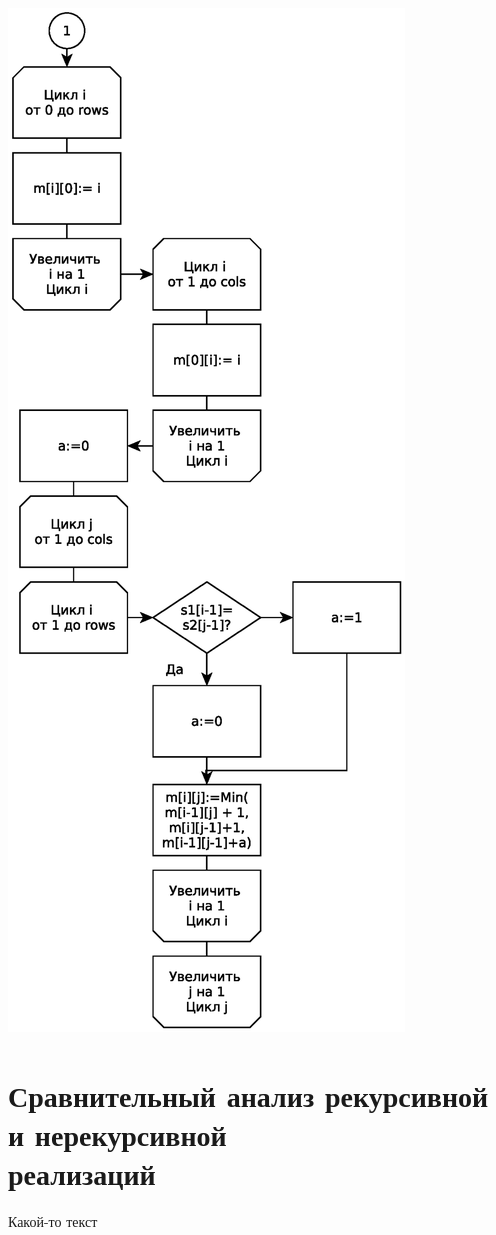 \includegraphics[scale=0.75]{schemes/levenshtein-iterative-eps-2}

\section{Сравнительный анализ рекурсивной и нерекурсивной\\ реализаций}

Какой-то текст
